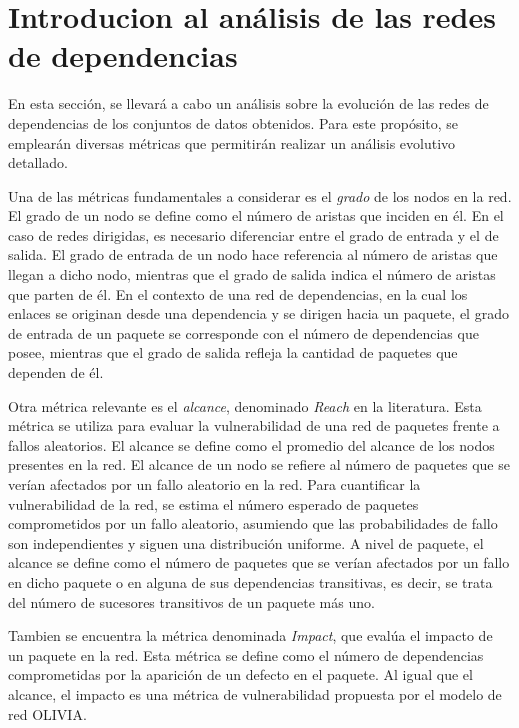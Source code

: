 \section{Introducion al análisis de las redes de dependencias}

En esta sección, se llevará a cabo un análisis sobre la evolución de las redes de dependencias de los conjuntos
de datos obtenidos. Para este propósito, se emplearán diversas métricas que permitirán realizar un análisis
evolutivo detallado.

Una de las métricas fundamentales a considerar es el \emph{grado} de los nodos en la red. El grado de un nodo
se define como el número de aristas que inciden en él. En el caso de redes dirigidas, es necesario diferenciar
entre el grado de entrada y el de salida. El grado de entrada de un nodo hace referencia al número de aristas
que llegan a dicho nodo, mientras que el grado de salida indica el número de aristas que parten de él. En el
contexto de una red de dependencias, en la cual los enlaces se originan desde una dependencia y se dirigen hacia
un paquete, el grado de entrada de un paquete se corresponde con el número de dependencias que posee, mientras
que el grado de salida refleja la cantidad de paquetes que dependen de él.

Otra métrica relevante es el \emph{alcance}, denominado \emph{Reach} en la literatura. Esta métrica se utiliza
para evaluar la vulnerabilidad de una red de paquetes frente a fallos aleatorios. El alcance se define como el
promedio del alcance de los nodos presentes en la red. El alcance de un nodo se refiere al número de paquetes
que se verían afectados por un fallo aleatorio en la red. Para cuantificar la vulnerabilidad de la red, se estima
el número esperado de paquetes comprometidos por un fallo aleatorio, asumiendo que las probabilidades de fallo
son independientes y siguen una distribución uniforme. A nivel de paquete, el alcance se define como el número
de paquetes que se verían afectados por un fallo en dicho paquete o en alguna de sus dependencias transitivas,
es decir, se trata del número de sucesores transitivos de un paquete más uno.

Tambien se encuentra la métrica denominada \emph{Impact}, que evalúa el impacto de un paquete en la red.
Esta métrica se define como el número de dependencias comprometidas por la aparición de un defecto en el paquete.
Al igual que el alcance, el impacto es una métrica de vulnerabilidad propuesta por el modelo de red OLIVIA. \cite{Seto-Rey20231}

